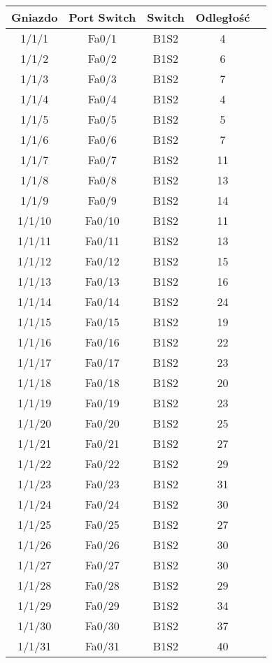 \begin{center}
    \begin{longtable}{|c|c|c|c|c|}
    \hline
    Gniazdo & Port Switch & Switch & Odległość \\ \hline
	1/1/1 & Fa0/1 & B1S2 & 4 \\ \hline
	1/1/2 & Fa0/2 & B1S2 & 6 \\ \hline
	1/1/3 & Fa0/3 & B1S2 & 7 \\ \hline
	1/1/4 & Fa0/4 & B1S2 & 4 \\ \hline
	1/1/5 & Fa0/5 & B1S2 & 5 \\ \hline
	1/1/6 & Fa0/6 & B1S2 & 7 \\ \hline
	1/1/7 & Fa0/7 & B1S2 & 11 \\ \hline
	1/1/8 & Fa0/8 & B1S2 & 13 \\ \hline
	1/1/9 & Fa0/9 & B1S2 & 14 \\ \hline
	1/1/10 & Fa0/10 & B1S2 & 11 \\ \hline
	1/1/11 & Fa0/11 & B1S2 & 13 \\ \hline
	1/1/12 & Fa0/12 & B1S2 & 15 \\ \hline
	1/1/13 & Fa0/13 & B1S2 & 16 \\ \hline
	1/1/14 & Fa0/14 & B1S2 & 24 \\ \hline
	1/1/15 & Fa0/15 & B1S2 & 19 \\ \hline
	1/1/16 & Fa0/16 & B1S2 & 22 \\ \hline
	1/1/17 & Fa0/17 & B1S2 & 23 \\ \hline
	1/1/18 & Fa0/18 & B1S2 & 20 \\ \hline
	1/1/19 & Fa0/19 & B1S2 & 23 \\ \hline
	1/1/20 & Fa0/20 & B1S2 & 25 \\ \hline
	1/1/21 & Fa0/21 & B1S2 & 27 \\ \hline
	1/1/22 & Fa0/22 & B1S2 & 29 \\ \hline
	1/1/23 & Fa0/23 & B1S2 & 31 \\ \hline
	1/1/24 & Fa0/24 & B1S2 & 30 \\ \hline
	1/1/25 & Fa0/25 & B1S2 & 27 \\ \hline
	1/1/26 & Fa0/26 & B1S2 & 30 \\ \hline
	1/1/27 & Fa0/27 & B1S2 & 30 \\ \hline
	1/1/28 & Fa0/28 & B1S2 & 29 \\ \hline
	1/1/29 & Fa0/29 & B1S2 & 34 \\ \hline
	1/1/30 & Fa0/30 & B1S2 & 37 \\ \hline
	1/1/31 & Fa0/31 & B1S2 & 40 \\ \hline

\end{longtable}
\end{center}
